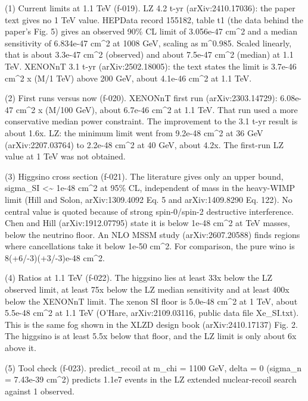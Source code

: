 \documentclass[11pt,a4paper]{article}
\begin{document}
(1) Current limits at 1.1 TeV (f-019). LZ 4.2 t-yr (arXiv:2410.17036): the paper text gives no 1 TeV value. HEPData record 155182, table t1 (the data behind the paper's Fig. 5) gives an observed 90\% CL limit of 3.056e-47 cm\textasciicircum{}2 and a median sensitivity of 6.834e-47 cm\textasciicircum{}2 at 1008 GeV, scaling as m\textasciicircum{}0.985. Scaled linearly, that is about 3.3e-47 cm\textasciicircum{}2 (observed) and about 7.5e-47 cm\textasciicircum{}2 (median) at 1.1 TeV. XENONnT 3.1 t-yr (arXiv:2502.18005): the text states the limit is 3.7e-46 cm\textasciicircum{}2 x (M/1 TeV) above 200 GeV, about 4.1e-46 cm\textasciicircum{}2 at 1.1 TeV.

(2) First runs versus now (f-020). XENONnT first run (arXiv:2303.14729): 6.08e-47 cm\textasciicircum{}2 x (M/100 GeV), about 6.7e-46 cm\textasciicircum{}2 at 1.1 TeV. That run used a more conservative median power constraint. The improvement to the 3.1 t-yr result is about 1.6x. LZ: the minimum limit went from 9.2e-48 cm\textasciicircum{}2 at 36 GeV (arXiv:2207.03764) to 2.2e-48 cm\textasciicircum{}2 at 40 GeV, about 4.2x. The first-run LZ value at 1 TeV was not obtained.

(3) Higgsino cross section (f-021). The literature gives only an upper bound, sigma\_SI \textless{}\textasciitilde{} 1e-48 cm\textasciicircum{}2 at 95\% CL, independent of mass in the heavy-WIMP limit (Hill and Solon, arXiv:1309.4092 Eq. 5 and arXiv:1409.8290 Eq. 122). No central value is quoted because of strong spin-0/spin-2 destructive interference. Chen and Hill (arXiv:1912.07795) state it is below 1e-48 cm\textasciicircum{}2 at TeV masses, below the neutrino floor. An NLO MSSM study (arXiv:2607.20588) finds regions where cancellations take it below 1e-50 cm\textasciicircum{}2. For comparison, the pure wino is 8(+6/-3)(+3/-3)e-48 cm\textasciicircum{}2.

(4) Ratios at 1.1 TeV (f-022). The higgsino lies at least 33x below the LZ observed limit, at least 75x below the LZ median sensitivity and at least 400x below the XENONnT limit. The xenon SI floor is 5.0e-48 cm\textasciicircum{}2 at 1 TeV, about 5.5e-48 cm\textasciicircum{}2 at 1.1 TeV (O'Hare, arXiv:2109.03116, public data file Xe\_SI.txt). This is the same fog shown in the XLZD design book (arXiv:2410.17137) Fig. 2. The higgsino is at least 5.5x below that floor, and the LZ limit is only about 6x above it.

(5) Tool check (f-023). predict\_recoil at m\_chi = 1100 GeV, delta = 0 (sigma\_n = 7.43e-39 cm\textasciicircum{}2) predicts 1.1e7 events in the LZ extended nuclear-recoil search against 1 observed.
\end{document}

